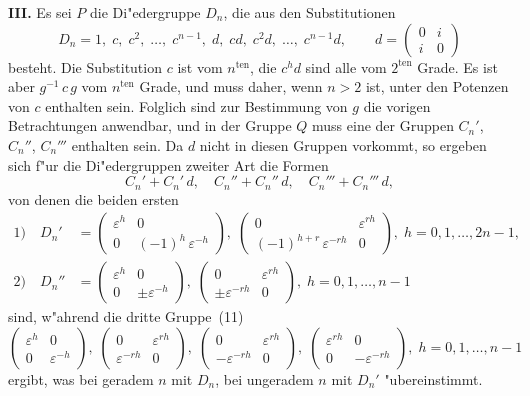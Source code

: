 \documentclass[12pt,a4paper]{article}
\theoremstyle{plain}
\theoremstyle{definition}
\theoremstyle{remark}
\begin{document}
\medskip\noindent\textbf{III.} Es sei $P$ die Di"edergruppe $D_{n}$, die aus den Substitutionen
\begin{equation}\tag{10}
D_{n} = 1,\; c,\; c^{2},\; \ldots,\; c^{n-1},\; d,\; cd,\; c^{2}d,\; \ldots,\; c^{n-1}d,\qquad
d = \begin{pmatrix} 0 & i \\ i & 0 \end{pmatrix}
\end{equation}
besteht. Die Substitution $c$ ist vom $n^{\text{ten}}$, die $c^{h}d$ sind alle vom $2^{\text{ten}}$ Grade. Es ist aber $g^{-1}\,c\,g$ vom $n^{\text{ten}}$ Grade, und muss daher, wenn $n > 2$ ist, unter den Potenzen von $c$ enthalten sein. Folglich sind zur Bestimmung von $g$ die vorigen Betrachtungen anwendbar, und in der Gruppe $Q$ muss eine der Gruppen $C_{n}'$, $C_{n}''$, $C_{n}'''$ enthalten sein. Da $d$ nicht in diesen Gruppen vorkommt, so ergeben sich f"ur die Di"edergruppen zweiter Art die Formen
\begin{equation}\tag{11}
C_{n}' + C_{n}'\,d,\quad C_{n}'' + C_{n}''\,d,\quad C_{n}''' + C_{n}'''\,d,
\end{equation}
von denen die beiden ersten
\begin{equation}\tag{12}
\begin{aligned}
\text{1)}\quad D_{n}' &= \begin{pmatrix} \varepsilon^{h} & 0 \\ 0 & (-1)^{h}\,\varepsilon^{-h} \end{pmatrix},\;
\begin{pmatrix} 0 & \varepsilon^{rh} \\ (-1)^{h+r}\,\varepsilon^{-rh} & 0 \end{pmatrix},\; h = 0, 1, \ldots, 2n-1, \\
\text{2)}\quad D_{n}'' &= \begin{pmatrix} \varepsilon^{h} & 0 \\ 0 & \pm\varepsilon^{-h} \end{pmatrix},\;
\begin{pmatrix} 0 & \varepsilon^{rh} \\ \pm\varepsilon^{-rh} & 0 \end{pmatrix},\; h = 0, 1, \ldots, n-1
\end{aligned}
\end{equation}
sind, w"ahrend die dritte Gruppe~(11)
\[
\begin{pmatrix} \varepsilon^{h} & 0 \\ 0 & \varepsilon^{-h} \end{pmatrix},\;
\begin{pmatrix} 0 & \varepsilon^{rh} \\ \varepsilon^{-rh} & 0 \end{pmatrix},\;
\begin{pmatrix} 0 & \varepsilon^{rh} \\ -\varepsilon^{-rh} & 0 \end{pmatrix},\;
\begin{pmatrix} \varepsilon^{rh} & 0 \\ 0 & -\varepsilon^{-rh} \end{pmatrix},\;
h = 0, 1, \ldots, n-1
\]
ergibt, was bei geradem $n$ mit $D_{n}$, bei ungeradem $n$ mit $D_{n}'$ "ubereinstimmt.
\end{document}
